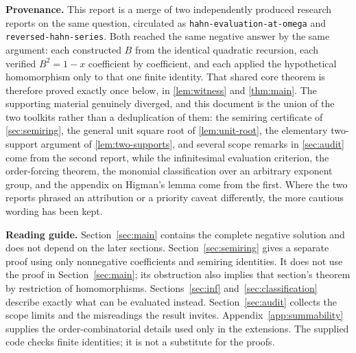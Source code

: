 \documentclass[11pt,letterpaper]{article}
\theoremstyle{definition}
\theoremstyle{remark}
\begin{document}
\begin{titlepage}
\vspace{.16in}
\noindent\textbf{Provenance.}
This report is a merge of two independently produced research reports on the
same question, circulated as \texttt{hahn-evaluation-at-omega} and
\texttt{reversed-hahn-series}. Both reached the same negative answer by the
same argument: each constructed $B$ from the identical quadratic recursion,
each verified $B^2=1-x$ coefficient by coefficient, and each applied the
hypothetical homomorphism only to that one finite identity. That shared core
theorem is therefore proved exactly once below, in \cref{lem:witness} and
\cref{thm:main}. The supporting material genuinely diverged, and this document
is the union of the two toolkits rather than a deduplication of them: the
semiring certificate of \cref{sec:semiring}, the general unit square root
of \cref{lem:unit-root}, the elementary two-support argument of
\cref{lem:two-supports}, and several scope remarks in \cref{sec:audit} come
from the second report, while the infinitesimal evaluation criterion, the
order-forcing theorem, the monomial classification over an arbitrary exponent
group, and the appendix on Higman's lemma come from the first. Where the two
reports phrased an attribution or a priority caveat differently, the more
cautious wording has been kept.
\vfill
{}
\end{titlepage}
\hypersetup{pageanchor=true}%

\tableofcontents
\vspace{1.0em}
\begin{resultbox}
\textbf{Reading guide.} Section~\ref{sec:main} contains the complete negative
solution and does not depend on the later sections.
Section~\ref{sec:semiring} gives a separate proof using only nonnegative
coefficients and semiring identities. It does not use the proof in
Section~\ref{sec:main}; its obstruction also implies that section's theorem
by restriction of homomorphisms. Sections~\ref{sec:inf}
and~\ref{sec:classification} describe exactly what can be evaluated instead.
Section~\ref{sec:audit} collects the scope limits and the misreadings the
result invites. Appendix~\ref{app:summability} supplies the order-combinatorial
details used only in the extensions. The supplied code checks finite identities;
it is not a substitute for the proofs.
\end{resultbox}
\clearpage
\end{document}
